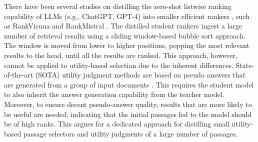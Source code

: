 There have been several studies on distilling the zero-shot listwise ranking capability of LLMs (e.g., ChatGPT, GPT-4) into smaller efficient rankers \cite{sun2023chatgpt,pradeep2023rankvicuna, pradeep2023rankzephyr, liu2025leveraging, reddy2024first}, such as RankVicuna \cite{pradeep2023rankvicuna} and RankMistral \cite{liu2025leveraging}. 
The distilled student rankers ingest a large number of retrieval results using a sliding window-based bubble sort approach. The window is moved from lower to higher positions, popping the most relevant results to the head, until all the results are ranked. 
This approach, however, cannot be applied to utility-based selection due to the inherent differences. State-of-the-art (SOTA) utility judgment methods are based on pseudo answers that are generated from a group of input documents \cite{zhang2024large,zhang2024iterative}. This requires the student model to also inherit the answer generation capability from the teacher model. Moreover, to ensure decent pseudo-answer quality, results that are more likely to be useful are needed, indicating that the initial passages fed to the model should be of high ranks. 
This argues for a dedicated approach for distilling small utility-based passage selectors and utility judgments of a large number of passages. 

